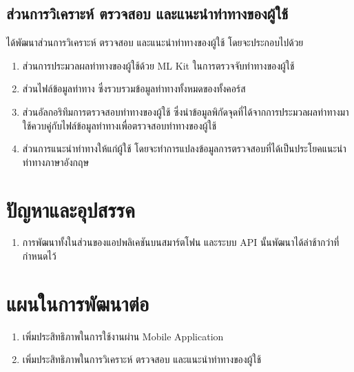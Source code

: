 \subsection{ส่วนการวิเคราะห์ ตรวจสอบ และแนะนำท่าทางของผู้ใช้}
ได้พัฒนาส่วนการวิเคราะห์ ตรวจสอบ และแนะนำท่าทางของผู้ใช้ โดยจะประกอบไปด้วย
\begin{enumerate}
    \item ส่วนการประมวลผลท่าทางของผู้ใช้ด้วย ML Kit ในการตรวจจับท่าทางของผู้ใช้
    \item ส่วนไฟล์ข้อมูลท่าทาง ซึ่งรวบรวมข้อมูลท่าทางทั้งหมดของทั้งคอร์ส
    \item ส่วนอัลกอริทึมการตรวจสอบท่าทางของผู้ใช้ ซึ่งนำข้อมูลพิกัดจุดที่ได้จากการประมวลผลท่าทางมาใช้ควบคู่กับไฟล์ข้อมูลท่าทางเพื่อตรวจสอบท่าทางของผู้ใช้
    \item ส่วนการแนะนำท่าทางให้แก่ผู้ใช้ โดยจะทำการแปลงข้อมูลการตรวจสอบที่ได้เป็นประโยคแนะนำท่าทางภาษาอังกฤษ
\end{enumerate}

\section{ปัญหาและอุปสรรค}
\begin{enumerate}
    \item การพัฒนาทั้งในส่วนของแอปพลิเคชันบนสมาร์ตโฟน และระบบ API นั้นพัฒนาได้ล่าช้ากว่าที่กำหนดไว้
\end{enumerate}

\section{แผนในการพัฒนาต่อ}
\begin{enumerate}
    \item เพิ่มประสิทธิภาพในการใช้งานผ่าน Mobile Application
    \item เพิ่มประสิทธิภาพในการวิเคราะห์ ตรวจสอบ และแนะนำท่าทางของผู้ใช้
\end{enumerate}


